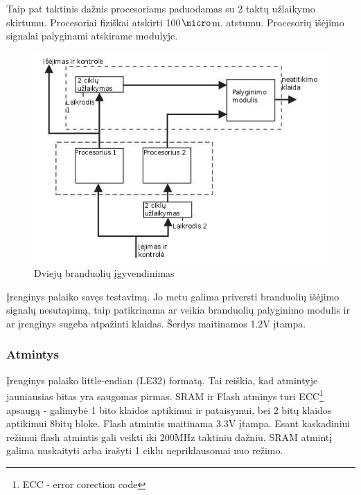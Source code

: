 \documentclass[a4paper, 12pt]{article} %
\begin{document}
\begin{onehalfspacing}
Taip pat taktinis da\v{z}nis procesoriams paduodamas su 2 takt\k{u} u\v{z}laikymo skirtumu. Procesoriai fizi\v{s}kai atskirti 100$\micro$m. atstumu.  
Procesori\k{u} i\v{s}\.ejimo signalai palyginami atskirame modulyje.
\begin{figure}[H] %
\centering %
\includegraphics[scale=2.8]{pav/impl.jpg} %
\captionsetup{labelformat=numbfirst} %
\captionsetup{labelseparator=tarpas}
\caption{Dviej\k{u} branduoli\k{u} \k{i}gyvendinimas}
\label{vienas}
\end{figure}
\k{I}renginys palaiko sav\k{e}s testavim\k{a}. Jo metu galima priversti branduoli\k{u} i\v{s}\.ejimo signal\k{u} nesutapim\k{a}, taip patikrinama ar veikia branduoli\k{u} palyginimo modulis ir ar \k{i}renginys sugeba atpa\v{z}inti klaidas. \v{S}erdys maitinamos 1.2V \k{i}tampa. 


\subsubsection{Atmintys}
\k{I}renginys palaiko little-endian $($LE32$)$ format\k{a}. Tai rei\v{s}kia, kad atmintyje jauniausias bitas yra saugomas pirmas.
SRAM ir Flash atminys turi ECC\footnote{ECC - error corection code} apsaug\k{a} - galimyb\.e 1 bito klaidos aptikimui ir pataisymui, bei 2 bit\k{u} klaidos aptikimui 8bit\k{u} bloke. Flash atmintis maitinama 3.3V \k{i}tampa. Esant kaskadiniui
re\v{z}imui flash atmintis gali veikti iki 200MHz taktiniu da\v{z}niu. SRAM atmint\k{i} galima nuskaityti arba ira\v{s}yti 1 ciklu nepriklausomai nuo re\v{z}imo.   



\end{onehalfspacing}
\end{document}
